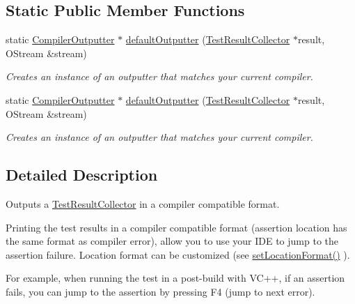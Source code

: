 \subsection*{Static Public Member Functions}
\begin{DoxyCompactItemize}
\item 
static \hyperlink{class_compiler_outputter}{Compiler\+Outputter} $\ast$ \hyperlink{class_compiler_outputter_aab880d6f8111706e2f08a59f39a800d1}{default\+Outputter} (\hyperlink{class_test_result_collector}{Test\+Result\+Collector} $\ast$result, O\+Stream \&stream)
\begin{DoxyCompactList}\small\item\em Creates an instance of an outputter that matches your current compiler. \end{DoxyCompactList}\item 
static \hyperlink{class_compiler_outputter}{Compiler\+Outputter} $\ast$ \hyperlink{class_compiler_outputter_aa0f8f9b1fb25fe8873b7454f91dcc929}{default\+Outputter} (\hyperlink{class_test_result_collector}{Test\+Result\+Collector} $\ast$result, O\+Stream \&stream)
\begin{DoxyCompactList}\small\item\em Creates an instance of an outputter that matches your current compiler. \end{DoxyCompactList}\end{DoxyCompactItemize}


\subsection{Detailed Description}
Outputs a \hyperlink{class_test_result_collector}{Test\+Result\+Collector} in a compiler compatible format.

Printing the test results in a compiler compatible format (assertion location has the same format as compiler error), allow you to use your I\+D\+E to jump to the assertion failure. Location format can be customized (see \hyperlink{class_compiler_outputter_a0d9e67c7bdcb443b0b2754d61a10790c}{set\+Location\+Format()} ). 

For example, when running the test in a post-\/build with V\+C++, if an assertion fails, you can jump to the assertion by pressing F4 (jump to next error).


